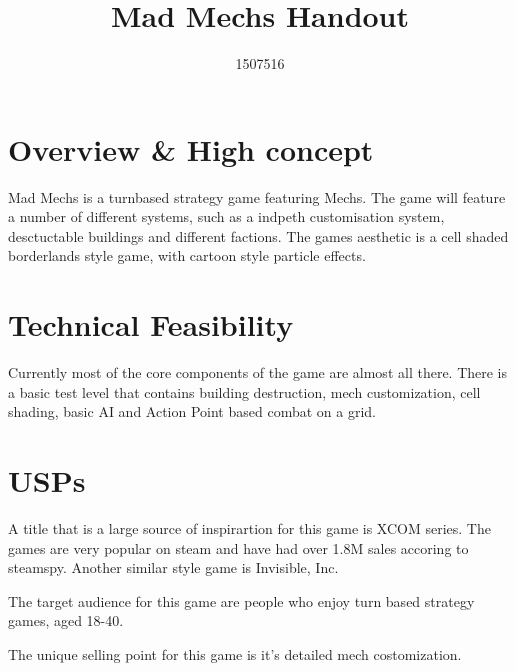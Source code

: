 \documentclass{tufte-handout}
\title{Mad Mechs Handout}
\author{1507516}
\begin{document}
\maketitle


\section{Overview \& High concept}
Mad Mechs is a turnbased strategy game featuring Mechs.
The game will feature a number of different systems, such as a indpeth customisation system, desctuctable buildings and different factions.
The games aesthetic is a cell shaded borderlands style game, with cartoon style particle effects.


\section{Technical Feasibility}
Currently most of the core components of the game are almost all there. There is a basic test level that contains building destruction, mech customization, cell shading, basic AI and Action Point based combat on a grid.


\section{USPs}
A title that is a large source of inspirartion for this  game is XCOM series. The games are very popular on steam and have had over 1.8M sales accoring to steamspy.
Another similar style game is Invisible, Inc.

The target audience for this game are people who enjoy turn based strategy games, aged 18-40.

The unique selling point for this game is it’s detailed mech costomization.
\end{document}
